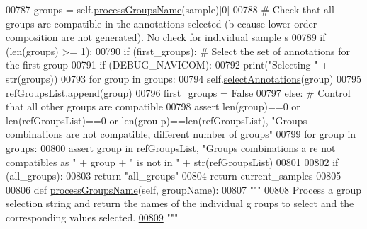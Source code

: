 \begin{DoxyCode}
00787             groups = self.\hyperlink{classnavicom_1_1navicom_1_1NaviCom_af04ea16f3ccb0d883f5b01471c0c1a6f}{processGroupsName}(sample)[0]
00788             \textcolor{comment}{# Check that all groups are compatible in the annotations selected (b
      ecause lower order composition are not generated). No check for individual sample
      s}
00789             \textcolor{keywordflow}{if} (len(groups) >= 1):
00790                 \textcolor{keywordflow}{if} (first\_groups): \textcolor{comment}{# Select the set of annotations for the first 
      group}
00791                     \textcolor{keywordflow}{if} (DEBUG\_NAVICOM):
00792                         \textcolor{keywordflow}{print}(\textcolor{stringliteral}{"Selecting "} + str(groups))
00793                     \textcolor{keywordflow}{for} group \textcolor{keywordflow}{in} groups:
00794                         self.\hyperlink{classnavicom_1_1navicom_1_1NaviCom_ad298207a958acd2cee82c7df7eace0d3}{selectAnnotations}(group) 
00795                         refGroupsList.append(group)
00796                         first\_groups = \textcolor{keyword}{False}
00797                 \textcolor{keywordflow}{else}: \textcolor{comment}{# Control that all other groups are compatible}
00798                         \textcolor{keyword}{assert} len(group)==0 \textcolor{keywordflow}{or} len(refGroupsList)==0 \textcolor{keywordflow}{or} len(grou
      p)==len(refGroupsList), \textcolor{stringliteral}{"Groups combinations are not compatible, different number
       of groups"}
00799                         \textcolor{keywordflow}{for} group \textcolor{keywordflow}{in} groups:
00800                             \textcolor{keyword}{assert} group \textcolor{keywordflow}{in} refGroupsList, \textcolor{stringliteral}{"Groups combinations a
      re not compatibles as "} + group + \textcolor{stringliteral}{" is not in "} + str(refGroupsList)
00801 
00802         \textcolor{keywordflow}{if} (all\_groups):
00803             \textcolor{keywordflow}{return} \textcolor{stringliteral}{"all\_groups"}
00804         \textcolor{keywordflow}{return} current\_samples
00805 
00806     \textcolor{keyword}{def }\hyperlink{classnavicom_1_1navicom_1_1NaviCom_af04ea16f3ccb0d883f5b01471c0c1a6f}{processGroupsName}(self, groupName):
00807         \textcolor{stringliteral}{"""}
00808 \textcolor{stringliteral}{        Process a group selection string and return the names of the individual g
      roups to select and the corresponding values selected.}
\hypertarget{navicom_8py_source_l00809}{}\hyperlink{classnavicom_1_1navicom_1_1NaviCom_af04ea16f3ccb0d883f5b01471c0c1a6f}{00809} \textcolor{stringliteral}{        """}

\end{DoxyCode}
